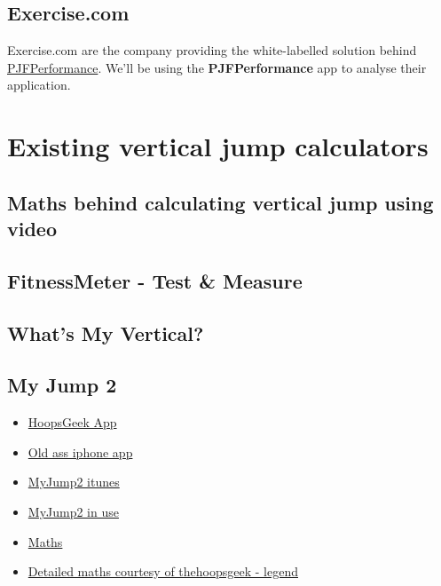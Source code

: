 \subsection{Exercise.com}
Exercise.com are the company providing the white-labelled solution behind \href{https://online.pjfperformance.net/users/sign_in/}{PJFPerformance}.
We'll be using the \textbf{PJFPerformance} app to analyse their application.


\section{Existing vertical jump calculators}
\subsection{Maths behind calculating vertical jump using video}
\subsection{FitnessMeter - Test \& Measure}
\subsection{What's My Vertical?}
\subsection{My Jump 2}


\begin{itemize}
	\item \href{https://www.thehoopsgeek.com/measurement-app/#manual}{HoopsGeek App}
	\item \href{https://apps.apple.com/us/app/fitnessmeter-test-measure/id477488986}{Old ass iphone app}
	\item \href{https://apps.apple.com/gb/app/my-jump-2/id1148617550#?platform=iphone}{MyJump2 itunes}
	\item \href{https://www.youtube.com/watch?v=tIBiHDyev6w}{MyJump2 in use}
	\item \href{https://www.topendsports.com/testing/products/vertical-jump/video.htm}{Maths}
	\item \href{https://www.thehoopsgeek.com/the-physics-of-the-vertical-jump/}{Detailed maths courtesy of thehoopsgeek - legend}
\end{itemize}